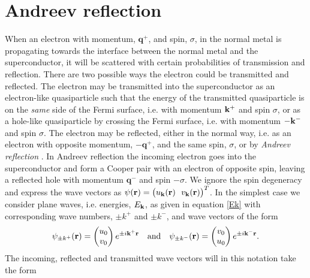 \section{Andreev reflection}
When an electron with momentum, $\mathbf{q}^+$, and spin, $\sigma$, in the normal metal is propagating towards the interface between the normal metal and the superconductor, it will be scattered with certain probabilities of transmission and reflection. There are two possible ways the electron could be transmitted and reflected. The electron may be transmitted into the superconductor as an electron-like quasiparticle such that the energy of the transmitted quasiparticle is on the \textit{same} side of the Fermi surface, i.e. with momentum $\mathbf{k}^+$ and spin $\sigma$, or as a hole-like quasiparticle by crossing the Fermi surface, i.e. with momentum $-\mathbf{k}^-$ and spin $\sigma$. The electron may be reflected, either in the normal way, i.e. as an electron with opposite momentum, $-\mathbf{q}^+$, and the same spin, $\sigma$, or by \textit{Andreev reflection} \cite{andreev64}. In Andreev reflection the incoming electron goes into the superconductor and form a Cooper pair with an electron of opposite spin, leaving a reflected hole with momentum $\mathbf{q}^-$ and spin $-\sigma$. We ignore the spin degeneracy and express the wave vectors as $\psi(\rbf) = \big( u_{\kbf}(\rbf) \ \ v_{\kbf}(\rbf)\big)^T$. In the simplest case we consider plane waves, i.e. energies, $E_{\mathbf{k}}$, as given in equation \eqref{Ek} with corresponding wave numbers, $\pm k^+$ and $\pm k^-$, and wave vectors of the form \cite{BTK82}
\begin{equation}
    \psi_{\pm k^+}(\mathbf{r}) =
    \begin{pmatrix}
        u_0 \\ v_0
    \end{pmatrix}
    e^{\pm i\mathbf{k}^+\mathbf{r}}
    \quad \mathrm{and} \quad
        \psi_{\pm k^-}(\mathbf{r}) =
    \begin{pmatrix}
        v_0 \\ u_0
    \end{pmatrix}
    e^{\pm i\mathbf{k}^-\mathbf{r}}.
\end{equation}
The incoming, reflected and transmitted wave vectors will in this notation take the form
